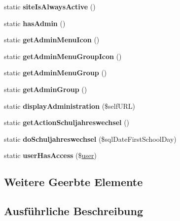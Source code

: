 \begin{DoxyCompactItemize}
static {\bfseries site\+Is\+Always\+Active} ()
\item 
\mbox{\label{classstundenplan_a0f57c50ad1875707bbaf4d0c2426d604}} 
static {\bfseries has\+Admin} ()
\item 
\mbox{\label{classstundenplan_a3943faad2f23f637ca7ec5b91797fe57}} 
static {\bfseries get\+Admin\+Menu\+Icon} ()
\item 
\mbox{\label{classstundenplan_a4be2f0b90f6908396bf1a11264af3817}} 
static {\bfseries get\+Admin\+Menu\+Group\+Icon} ()
\item 
\mbox{\label{classstundenplan_a9ded170dd05046c55b34f6eaa9f56cdf}} 
static {\bfseries get\+Admin\+Menu\+Group} ()
\item 
\mbox{\label{classstundenplan_a64341aed8dd077b61366773db7e6414c}} 
static {\bfseries get\+Admin\+Group} ()
\item 
\mbox{\label{classstundenplan_af9b9bec6fbe5e1584f2e361ed7990ba8}} 
static {\bfseries display\+Administration} (\$self\+U\+RL)
\item 
\mbox{\label{classstundenplan_a79c6f39d840fd0af8f59f8b78d063086}} 
static {\bfseries get\+Action\+Schuljahreswechsel} ()
\item 
\mbox{\label{classstundenplan_a1ef534632a78cb3cad9c9017187c634d}} 
static {\bfseries do\+Schuljahreswechsel} (\$sql\+Date\+First\+School\+Day)
\item 
\mbox{\label{classstundenplan_a04377aa3025e7100bab480c45b5aa2ea}} 
static {\bfseries user\+Has\+Access} (\$\mbox{\hyperlink{classuser}{user}})
\end{DoxyCompactItemize}
\subsection*{Weitere Geerbte Elemente}


\subsection{Ausführliche Beschreibung}


